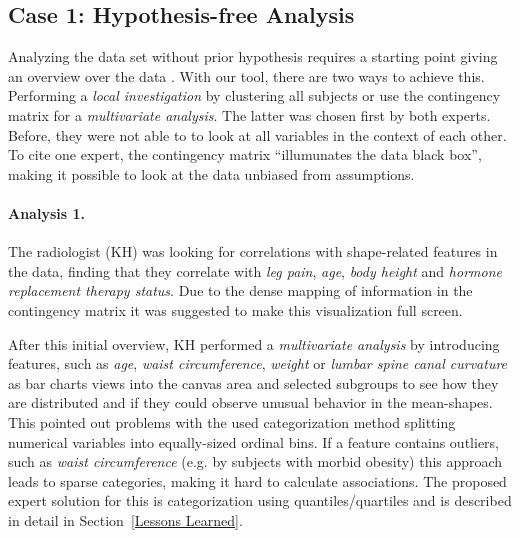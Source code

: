 \documentclass[journal]{style/vgtc} 			          %
\begin{document}
\subsection{Case 1: Hypothesis-free Analysis} \label{Hypothesis-free analysis}
Analyzing the data set without prior hypothesis requires a starting point giving an overview over the data \cite{Shneiderman1996}.
%
With our tool, there are two ways to achieve this.
%
Performing a \emph{local investigation} by clustering all subjects or use the contingency matrix for a \emph{multivariate analysis}.
%
The latter was chosen first by both experts.
%
Before, they were not able to to look at all variables in the context of each other.
%
%
To cite one expert, the contingency matrix ``illumunates the data black box'', making it possible to look at the data unbiased from assumptions.

\paragraph{Analysis 1.}
%
The radiologist (KH) was looking for correlations with shape-related features in the data, finding that they correlate with \emph{leg pain}, \emph{age}, \emph{body height} and \emph{hormone replacement therapy status}.
%
Due to the dense mapping of information in the contingency matrix it was suggested to make this visualization full screen.

After this initial overview, KH performed a \emph{multivariate analysis} by introducing features, such as \emph{age}, \emph{waist circumference}, \emph{weight} or \emph{lumbar spine canal curvature} as bar charts views into the canvas area and selected subgroups to see how they are distributed and if they could observe unusual behavior in the mean-shapes.
%
This pointed out problems with the used categorization method splitting numerical variables into equally-sized ordinal bins.
%
If a feature contains outliers, such as \emph{waist circumference} (e.g. by subjects with morbid obesity) this approach leads to sparse categories, making it hard to calculate associations.
%
The proposed expert solution for this is categorization using quantiles/quartiles and is described in detail in Section~\ref{Lessons Learned}.
\end{document}

